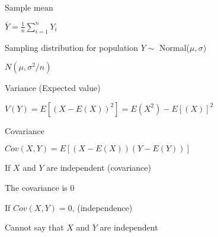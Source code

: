 \documentclass[12pt]{article}
\begin{document}
\begin{note}
    \begin{field}
        Sample mean
    \end{field}
    \begin{field}
        $\bar{Y} = \frac{1}{n}\sum_{i=1}^n Y_i$
    \end{field}
\end{note}

\begin{note}
    \begin{field}
        Sampling distribution for population $Y \sim $ Normal($\mu,\sigma$)
    \end{field}
    \begin{field}
        $N(\mu,\sigma^2/n)$
    \end{field}
\end{note}

\begin{note}
    \begin{field}
        Variance (Expected value)
    \end{field}
    \begin{field}
        $V(Y) = E[(X - E(X))^2] = E(X^2) - E[(X)]^2$
    \end{field}
\end{note}

\begin{note}
    \begin{field}
        Covariance
    \end{field}
    \begin{field}
        $Cov(X,Y) = E[(X - E(X))(Y - E(Y))]$
    \end{field}
\end{note}

\begin{note}
    \begin{field}
        If $X$ and $Y$ are independent (covariance)
    \end{field}
    \begin{field}
        The covariance is 0
    \end{field}
\end{note}

\begin{note}
    \begin{field}
        If $Cov(X,Y) = 0$, (independence)
    \end{field}
    \begin{field}
        Cannot say that $X$ and $Y$ are independent
    \end{field}
\end{note}
\end{document}
